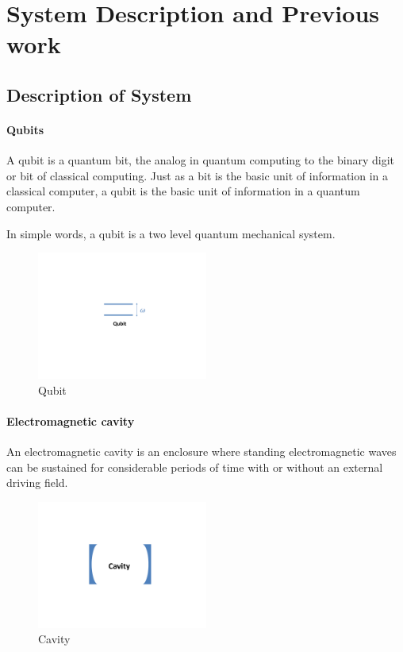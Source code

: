 \chapter{System Description and Previous work}
\section{Description of System}
\subsubsection{Qubits}
A qubit is a quantum bit, the analog in quantum computing to the binary digit or bit of classical computing. Just as a bit is the basic unit of information in a classical computer, a qubit is the basic unit of information in a quantum computer. \citep{Whatisqubit} 
\par
In simple words, a qubit is a two level quantum mechanical system.
\begin{figure}[h]
\centering
\includegraphics[width=0.5\textwidth]{Figr3a.pdf}
\caption{Qubit}
\label{fig:Figr3a}
\end{figure}


\subsubsection{Electromagnetic cavity}
An electromagnetic cavity  is an enclosure where standing electromagnetic waves can be sustained for considerable periods of time with or without an external driving field.%
\begin{figure}%
\centering
\includegraphics[width=0.5\textwidth]{Figr4a.pdf}
\caption{Cavity}
\label{fig:Figr4a}
\end{figure}


